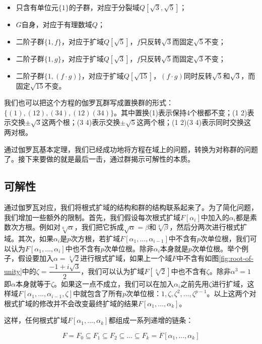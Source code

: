 \documentclass{article}
\begin{document}
\begin{itemize}
\item 只含有单位元$\{1\}$的子群，对应于分裂域$Q[\sqrt{3}, \sqrt{5}]$；
\item $G$自身，对应于有理数域$Q$；
\item 二阶子群$\{1, f\}$，对应于扩域$Q[\sqrt{5}]$，$f$只反转$\sqrt{3}$而固定$\sqrt{5}$不变；
\item 二阶子群$\{1, g\}$，对应于扩域$Q[\sqrt{3}]$，$f$只反转$\sqrt{5}$而固定$\sqrt{3}$不变；
\item 二阶子群$\{1, (f \cdot g)\}$，对应于扩域$Q[\sqrt{15}]$，$(f \cdot g)$同时反转$\sqrt{5}$和$\sqrt{3}$，而固定$\sqrt{15}$不变。
\end{itemize}

我们也可以把这个方程的伽罗瓦群写成置换群的形式：$\{(1), (1 2), (3 4), (1 2)(3 4)\}$。其中置换(1)表示保持4个根都不变；(1 2)表示交换$\pm \sqrt{3}$这两个根；(3 4)表示交换$\pm \sqrt{5}$这两个根；(1 2)(3 4)表示同时交换这两对根。

通过伽罗瓦基本定理，我们已经成功地将方程在域上的问题，转换为对称群的问题了。接下来要做的就是最后一击，通过群揭示可解性的本质。

\subsection{可解性}

通过伽罗瓦对应，我们将根式扩域的结构和群的结构联系起来了。为了简化问题，我们增加一些额外的限制。首先，我们假设每次根式扩域$F[\alpha_i]$中加入的$\alpha_i$都是素数次方根。例如对$\sqrt[6]{\alpha}$，我们把它拆成$\sqrt{\alpha} = \beta$和$\sqrt[3]{\beta}$，然后分两次进行根式扩域。其次，如果$\alpha_i$是$p$次方根，若扩域$F[\alpha_1, ..., \alpha_{i-1}]$中不含有$p$次单位根，我们可以认为$F[\alpha_1, ..., \alpha_i]$中也不含有$p$次单位根。除非$\alpha_i$本身就是$p$次单位根。举个例子，假设要加入$\alpha = \sqrt[3]{2}$进行根式扩域，如果上一个域$F$中不含有如图\ref{fig:root-of-unity}中的$\zeta = \dfrac{-1 + i\sqrt{3}}{2}$，我们可以认为扩域$F[\sqrt[3]{2}]$中也不含有$\zeta$。除非$\alpha^3 = 1$即$\alpha$本身就等于$\zeta$。如果这一点不成立，我们可以在加入$\alpha_i$之前先用$\zeta$进行扩域，这样域$F[\alpha_1, ..., \alpha_{i-1}, \zeta]$中就包含了所有$p$次单位根：$1, \zeta, \zeta^2, ..., \zeta^{p-1}$。以上这两个对根式扩域的修改并不会改变最终扩域的结果$F[\alpha_1, ..., \alpha_k]$。

这样，任何根式扩域$F[\alpha_1, ..., \alpha_k]$都组成一系列递增的链条：

\[
F = F_0 \subseteq F_1 \subseteq F_2 \subseteq ... \subseteq F_k = F[\alpha_1, ..., \alpha_k]
\]
\end{document}
